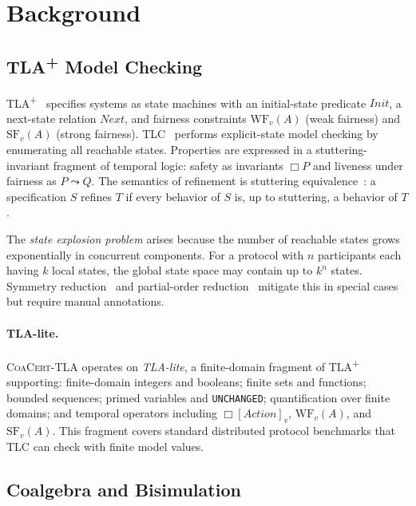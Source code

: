 \documentclass[11pt]{article}
\newcommand{\WF}{\ensuremath{\mathrm{WF}}}
\newcommand{\SF}{\ensuremath{\mathrm{SF}}}
\newcommand{\CoaCert}{\textsc{CoaCert-TLA}}
\newcommand{\TLAplus}{TLA\textsuperscript{+}}
\begin{document}
\section{Background}
\label{sec:background}

\subsection{\TLAplus{} Model Checking}

\TLAplus{}~\cite{Lamport02} specifies systems as state machines with an
initial-state predicate $\mathit{Init}$, a next-state relation
$\mathit{Next}$, and fairness constraints $\WF_v(A)$ (weak fairness) and
$\SF_v(A)$ (strong fairness).
TLC~\cite{TLC} performs explicit-state model checking by enumerating all
reachable states.
Properties are expressed in a stuttering-invariant fragment of temporal
logic: safety as invariants $\Box P$ and liveness under fairness as
$P \leadsto Q$.
The semantics of refinement is stuttering equivalence~\cite{Lamport94}:
a specification $S$ refines $T$ if every behavior of $S$ is, up to
stuttering, a behavior of $T$.

The \emph{state explosion problem} arises because the number of reachable
states grows exponentially in concurrent components.
For a protocol with $n$ participants each having $k$ local states, the
global state space may contain up to $k^n$ states.
Symmetry reduction~\cite{IpD96} and partial-order reduction~\cite{Peled93}
mitigate this in special cases but require manual annotations.

\paragraph{TLA-lite.}
\CoaCert{} operates on \emph{TLA-lite}, a finite-domain fragment of
\TLAplus{} supporting: finite-domain integers and booleans; finite sets
and functions; bounded sequences; primed variables and \texttt{UNCHANGED};
quantification over finite domains; and temporal operators including
$\Box[\mathit{Action}]_v$, $\WF_v(A)$, and $\SF_v(A)$.
This fragment covers standard distributed protocol benchmarks that TLC
can check with finite model values.

\subsection{Coalgebra and Bisimulation}
\end{document}
